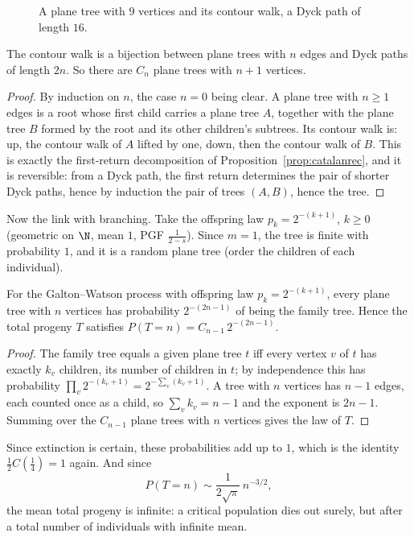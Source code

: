 \begin{figure}[ht]
\centering
{}
\caption{A plane tree with $9$ vertices and its contour walk, a Dyck path of length $16$.}
\label{fig:contour}
\end{figure}

\begin{proposition}\label{prop:planetrees}
The contour walk is a bijection between plane trees with $n$ edges and Dyck paths of length $2n$. So there are
$C_n$ plane trees with $n+1$ vertices.
\end{proposition}
\begin{proof}
By induction on $n$, the case $n=0$ being clear. A plane tree with $n\ge1$ edges is a root whose first child carries a
plane tree $A$, together with the plane tree $B$ formed by the root and its other children's subtrees. Its contour walk
is: up, the contour walk of $A$ lifted by one, down, then the contour walk of $B$. This is exactly the first-return
decomposition of Proposition~\ref{prop:catalanrec}, and it is reversible: from a Dyck path, the first return determines the
pair of shorter Dyck paths, hence by induction the pair of trees $(A,B)$, hence the tree.
\end{proof}

Now the link with branching. Take the offspring law $p_k=2^{-(k+1)}$, $k\ge0$ (geometric on $\N$, mean $1$, PGF $\frac1{2-s}$).
Since $m=1$, the tree is finite with probability $1$, and it is a random plane tree (order the children of each individual).

\begin{theorem}\label{thm:criticalgw}
For the Galton--Watson process with offspring law $p_k=2^{-(k+1)}$, every plane tree with $n$ vertices has probability
$2^{-(2n-1)}$ of being the family tree. Hence the total progeny $T$ satisfies $P(T=n)=C_{n-1}\,2^{-(2n-1)}$.
\end{theorem}
\begin{proof}
The family tree equals a given plane tree $t$ iff every vertex $v$ of $t$ has exactly $k_v$ children, its number of
children in $t$; by independence this has probability $\prod_v2^{-(k_v+1)}=2^{-\sum_v(k_v+1)}$. A tree with $n$ vertices has
$n-1$ edges, each counted once as a child, so $\sum_vk_v=n-1$ and the exponent is $2n-1$. Summing over the $C_{n-1}$ plane trees
with $n$ vertices gives the law of $T$.
\end{proof}

Since extinction is certain, these probabilities add up to $1$, which is the identity $\frac12C(\frac14)=1$ again. And since
\[
P(T=n)\sim\frac1{2\sqrt\pi}\,n^{-3/2},
\]
the mean total progeny is infinite: a critical population dies out surely, but after a
total number of individuals with infinite mean.

